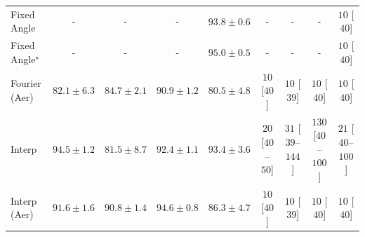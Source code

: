 \begin{tabular}{l|cccc|cccc|}
Fixed Angle & {\cellcolor[HTML]{000000}} \color[HTML]{F1F1F1} {\cellcolor{white}} \color{black} - & {\cellcolor[HTML]{000000}} \color[HTML]{F1F1F1} {\cellcolor{white}} \color{black} - & {\cellcolor[HTML]{000000}} \color[HTML]{F1F1F1} {\cellcolor{white}} \color{black} - & {\cellcolor[HTML]{7B2B05}} \color[HTML]{F1F1F1} $93.8\pm 0.6$ & {\cellcolor[HTML]{000000}} \color[HTML]{F1F1F1} {\cellcolor{white}} \color{black} - & {\cellcolor[HTML]{000000}} \color[HTML]{F1F1F1} {\cellcolor{white}} \color{black} - & {\cellcolor[HTML]{000000}} \color[HTML]{F1F1F1} {\cellcolor{white}} \color{black} - & {\cellcolor[HTML]{FFF5F1}} \color[HTML]{000000} $10$ [$40$] \\
Fixed Angle$^\star$ & {\cellcolor[HTML]{000000}} \color[HTML]{F1F1F1} {\cellcolor{white}} \color{black} - & {\cellcolor[HTML]{000000}} \color[HTML]{F1F1F1} {\cellcolor{white}} \color{black} - & {\cellcolor[HTML]{000000}} \color[HTML]{F1F1F1} {\cellcolor{white}} \color{black} - & {\cellcolor[HTML]{6B2606}} \color[HTML]{F1F1F1} $95.0\pm 0.5$ & {\cellcolor[HTML]{000000}} \color[HTML]{F1F1F1} {\cellcolor{white}} \color{black} - & {\cellcolor[HTML]{000000}} \color[HTML]{F1F1F1} {\cellcolor{white}} \color{black} - & {\cellcolor[HTML]{000000}} \color[HTML]{F1F1F1} {\cellcolor{white}} \color{black} - & {\cellcolor[HTML]{FFF5F1}} \color[HTML]{000000} $10$ [$40$] \\
Fourier (Aer) & {\cellcolor[HTML]{F4821D}} \color[HTML]{F1F1F1} $82.1\pm 6.3$ & {\cellcolor[HTML]{E46710}} \color[HTML]{F1F1F1} $84.7\pm 2.1$ & {\cellcolor[HTML]{A13804}} \color[HTML]{F1F1F1} $90.9\pm 1.2$ & {\cellcolor[HTML]{FB9326}} \color[HTML]{000000} $80.5\pm 4.8$ & {\cellcolor[HTML]{FFF5F1}} \color[HTML]{000000} $10$ [$40$] & {\cellcolor[HTML]{FFF5F1}} \color[HTML]{000000} $10$ [$39$] & {\cellcolor[HTML]{FFF5F1}} \color[HTML]{000000} $10$ [$40$] & {\cellcolor[HTML]{FFF5F1}} \color[HTML]{000000} $10$ [$40$] \\
Interp & {\cellcolor[HTML]{712806}} \color[HTML]{F1F1F1} $94.5\pm 1.2$ & {\cellcolor[HTML]{F78921}} \color[HTML]{F1F1F1} $81.5\pm 8.7$ & {\cellcolor[HTML]{8C3004}} \color[HTML]{F1F1F1} $92.4\pm 1.1$ & {\cellcolor[HTML]{802D05}} \color[HTML]{F1F1F1} $93.4\pm 3.6$ & {\cellcolor[HTML]{FFF3EF}} \color[HTML]{000000} $20$ [$40$--$50$] & {\cellcolor[HTML]{FEEFEB}} \color[HTML]{000000} $31$ [$39$--$144$] & {\cellcolor[HTML]{FDD3CF}} \color[HTML]{000000} $130$ [$40$--$100$] & {\cellcolor[HTML]{FFF2EE}} \color[HTML]{000000} $21$ [$40$--$100$] \\
Interp (Aer) & {\cellcolor[HTML]{983404}} \color[HTML]{F1F1F1} $91.6\pm 1.6$ & {\cellcolor[HTML]{A33904}} \color[HTML]{F1F1F1} $90.8\pm 1.4$ & {\cellcolor[HTML]{702806}} \color[HTML]{F1F1F1} $94.6\pm 0.8$ & {\cellcolor[HTML]{D75908}} \color[HTML]{F1F1F1} $86.3\pm 4.7$ & {\cellcolor[HTML]{FFF5F1}} \color[HTML]{000000} $10$ [$40$] & {\cellcolor[HTML]{FFF5F1}} \color[HTML]{000000} $10$ [$39$] & {\cellcolor[HTML]{FFF5F1}} \color[HTML]{000000} $10$ [$40$] & {\cellcolor[HTML]{FFF5F1}} \color[HTML]{000000} $10$ [$40$] \\

\end{tabular}
